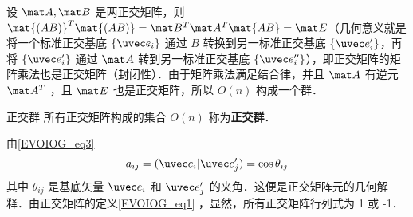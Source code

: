 设 $\mat A,\mat B$ 是两正交矩阵，则 $\mat{(AB)}^T\mat{(AB)}=\mat B^T\mat A^T\mat{AB}=\mat E$（几何意义就是将一个标准正交基底 $\{ \uvec e_i\}$ 通过 $B$ 转换到另一标准正交基底 $\{\uvec e'_i\}$，再将 $\{\uvec e'_i\}$ 通过 $\mat A$ 转到另一标准正交基底 $\{\uvec e''_i\}$），即正交矩阵的矩阵乘法也是正交矩阵（封闭性）．由于矩阵乘法满足结合律，并且 $\mat A$ 有逆元 $\mat A^T$ ，且 $\mat E$ 也是正交矩阵，所以 $O(n)$ 构成一个群．
\begin{definition}{正交群}
所有正交矩阵构成的集合 $O(n)$ 称为\textbf{正交群}．
\end{definition}

由\autoref{EVOIOG_eq3} 
\begin{equation}
a_{ij}=(\uvec e_i|\uvec e'_j)=\cos{\theta_{ij}}
\end{equation}
其中 $\theta_{ij}$ 是基底矢量 $\uvec e_i$ 和 $\uvec e'_j$ 的夹角．这便是正交矩阵元的几何解释．由正交矩阵的定义\autoref{EVOIOG_eq1} ，显然，所有正交矩阵行列式为 1 或 -1．